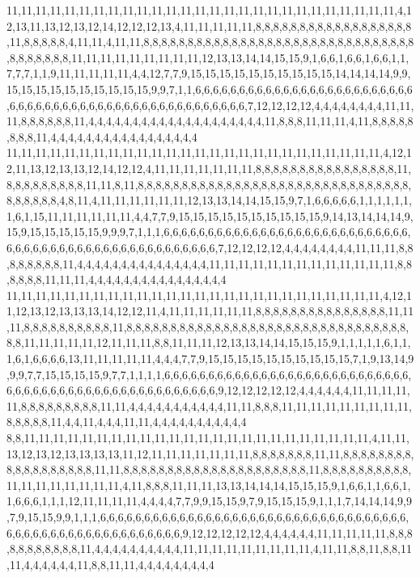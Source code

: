 11,11,11,11,11,11,11,11,11,11,11,11,11,11,11,11,11,11,11,11,11,11,11,11,11,11,11,4,12,13,11,13,12,13,12,14,12,12,12,13,4,11,11,11,11,11,8,8,8,8,8,8,8,8,8,8,8,8,8,8,8,8,8,8,11,8,8,8,8,8,4,11,11,4,11,11,8,8,8,8,8,8,8,8,8,8,8,8,8,8,8,8,8,8,8,8,8,8,8,8,8,8,8,8,8,8,8,8,8,8,8,8,8,8,11,11,11,11,11,11,11,11,11,12,13,13,14,14,15,15,9,1,6,6,1,6,6,1,6,6,1,1,7,7,7,1,1,9,11,11,11,11,11,4,4,12,7,7,9,15,15,15,15,15,15,15,15,15,15,14,14,14,14,9,9,15,15,15,15,15,15,15,15,15,15,9,9,7,1,1,6,6,6,6,6,6,6,6,6,6,6,6,6,6,6,6,6,6,6,6,6,6,6,6,6,6,6,6,6,6,6,6,6,6,6,6,6,6,6,6,6,6,6,6,6,6,6,6,6,6,6,6,7,12,12,12,12,4,4,4,4,4,4,4,4,11,11,11,8,8,8,8,8,8,11,4,4,4,4,4,4,4,4,4,4,4,4,4,4,4,4,4,4,4,4,11,8,8,8,11,11,11,4,11,8,8,8,8,8,8,8,8,11,4,4,4,4,4,4,4,4,4,4,4,4,4,4,4,4,4
11,11,11,11,11,11,11,11,11,11,11,11,11,11,11,11,11,11,11,11,11,11,11,11,11,11,4,12,12,11,13,12,13,13,12,14,12,12,4,11,11,11,11,11,11,11,8,8,8,8,8,8,8,8,8,8,8,8,8,8,8,8,11,8,8,8,8,8,8,8,8,8,11,11,8,11,8,8,8,8,8,8,8,8,8,8,8,8,8,8,8,8,8,8,8,8,8,8,8,8,8,8,8,8,8,8,8,8,8,8,8,8,8,4,8,11,4,11,11,11,11,11,11,12,13,13,14,14,15,15,9,7,1,6,6,6,6,6,1,1,1,1,1,1,1,6,1,15,11,11,11,11,11,11,4,4,7,7,9,15,15,15,15,15,15,15,15,15,15,9,14,13,14,14,14,9,15,9,15,15,15,15,15,9,9,9,7,1,1,1,6,6,6,6,6,6,6,6,6,6,6,6,6,6,6,6,6,6,6,6,6,6,6,6,6,6,6,6,6,6,6,6,6,6,6,6,6,6,6,6,6,6,6,6,6,6,6,6,6,6,6,6,7,12,12,12,12,4,4,4,4,4,4,4,4,11,11,11,8,8,8,8,8,8,8,8,11,4,4,4,4,4,4,4,4,4,4,4,4,4,4,4,11,11,11,11,11,11,11,11,11,11,11,11,11,8,8,8,8,8,8,11,11,11,4,4,4,4,4,4,4,4,4,4,4,4,4,4,4,4
11,11,11,11,11,11,11,11,11,11,11,11,11,11,11,11,11,11,11,11,11,11,11,11,11,11,4,12,11,12,13,12,13,13,13,14,12,12,11,4,11,11,11,11,11,11,8,8,8,8,8,8,8,8,8,8,8,8,8,8,8,11,11,11,8,8,8,8,8,8,8,8,8,8,11,8,8,8,8,8,8,8,8,8,8,8,8,8,8,8,8,8,8,8,8,8,8,8,8,8,8,8,8,8,8,8,8,8,8,11,11,11,11,11,12,11,11,11,8,8,11,11,11,12,13,13,14,14,15,15,15,9,1,1,1,1,1,6,1,1,1,6,1,6,6,6,6,13,11,11,11,11,11,4,4,4,7,7,9,15,15,15,15,15,15,15,15,15,15,7,1,9,13,14,9,9,9,7,7,15,15,15,15,9,7,7,1,1,1,1,6,6,6,6,6,6,6,6,6,6,6,6,6,6,6,6,6,6,6,6,6,6,6,6,6,6,6,6,6,6,6,6,6,6,6,6,6,6,6,6,6,6,6,6,6,6,6,6,6,6,6,6,9,12,12,12,12,12,4,4,4,4,4,4,11,11,11,11,11,8,8,8,8,8,8,8,8,8,11,11,4,4,4,4,4,4,4,4,4,4,4,11,11,8,8,8,11,11,11,11,11,11,11,11,11,8,8,8,8,8,11,4,4,11,4,4,4,11,11,4,4,4,4,4,4,4,4,4,4,4
8,8,11,11,11,11,11,11,11,11,11,11,11,11,11,11,11,11,11,11,11,11,11,11,11,11,4,11,11,13,12,13,12,13,13,13,13,11,12,11,11,11,11,11,11,11,8,8,8,8,8,8,8,11,11,8,8,8,8,8,8,8,8,8,8,8,8,8,8,8,8,8,8,11,11,8,8,8,8,8,8,8,8,8,8,8,8,8,8,8,8,8,8,8,8,8,11,8,8,8,8,8,8,8,8,8,8,11,11,11,11,11,11,11,11,4,11,8,8,8,11,11,11,13,13,14,14,14,15,15,15,9,1,6,6,1,1,6,6,1,1,6,6,6,1,1,1,12,11,11,11,11,4,4,4,4,7,7,9,9,15,15,9,7,9,15,15,15,9,1,1,1,7,14,14,14,9,9,7,9,15,15,9,9,1,1,1,6,6,6,6,6,6,6,6,6,6,6,6,6,6,6,6,6,6,6,6,6,6,6,6,6,6,6,6,6,6,6,6,6,6,6,6,6,6,6,6,6,6,6,6,6,6,6,6,6,6,6,6,6,6,6,9,12,12,12,12,12,4,4,4,4,4,4,11,11,11,11,11,8,8,8,8,8,8,8,8,8,8,8,11,4,4,4,4,4,4,4,4,4,4,11,11,11,11,11,11,11,11,11,4,11,11,8,8,11,8,8,11,11,4,4,4,4,4,4,11,8,8,11,11,4,4,4,4,4,4,4,4,4
